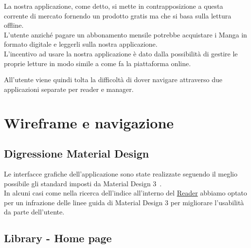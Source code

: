 \documentclass{report}
\begin{document}
La nostra applicazione, come detto, si mette in contrapposizione a
questa corrente di mercato fornendo un prodotto gratis ma che si basa
sulla lettura offline.\\
L'utente anziché pagare un abbonamento mensile potrebbe acquistare i
Manga in formato digitale e leggerli sulla nostra applicazione.\\
L'incentivo ad usare la nostra applicazione è dato dalla possibilità di
gestire le proprie letture in modo simile a come fa la piattaforma
online.

All'utente viene quindi tolta la difficoltà di dover navigare attraverso
due applicazioni separate per reader e manager.

\chapter{Wireframe e navigazione}

\section{Digressione Material Design}

Le interfacce grafiche dell'applicazione sono state realizzate seguendo il meglio possibile gli standard imposti da Material Design 3~\cite{matDes}.\\
In alcuni casi come nella ricerca dell'indice all'interno del \hyperref[sec:raeder]{Reader} abbiamo optato per un infrazione delle linee guida di Material Design 3 per migliorare l'usabilità da parte dell'utente.

\section{Library - Home page}
\label{sec:home}
\end{document}
